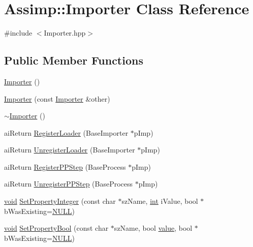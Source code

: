 \hypertarget{class_assimp_1_1_importer}{\section{Assimp\-:\-:Importer Class Reference}
\label{class_assimp_1_1_importer}
}


{\ttfamily \#include $<$Importer.\-hpp$>$}

\subsection*{Public Member Functions}
\begin{DoxyCompactItemize}
\item 
\hyperlink{class_assimp_1_1_importer_a2c207299ed05f1db1ad1e6dab005f719}{Importer} ()
\item 
\hyperlink{class_assimp_1_1_importer_a69743664b5a7a8c195be48265144317b}{Importer} (const \hyperlink{class_assimp_1_1_importer}{Importer} \&other)
\item 
\hyperlink{class_assimp_1_1_importer_a3d65af5286ba22f46220a72a6eb2a1c9}{$\sim$\-Importer} ()
\item 
ai\-Return \hyperlink{class_assimp_1_1_importer_a3846294ffe76d91a1d3096d22d7c6b7d}{Register\-Loader} (Base\-Importer $\ast$p\-Imp)
\item 
ai\-Return \hyperlink{class_assimp_1_1_importer_a3b1f5af2c763b13aca0f324b19001722}{Unregister\-Loader} (Base\-Importer $\ast$p\-Imp)
\item 
ai\-Return \hyperlink{class_assimp_1_1_importer_a102650d3648c0e414a1e73bdad9bed35}{Register\-P\-P\-Step} (Base\-Process $\ast$p\-Imp)
\item 
ai\-Return \hyperlink{class_assimp_1_1_importer_a3a683671c7c40638b1103c5d3648d86c}{Unregister\-P\-P\-Step} (Base\-Process $\ast$p\-Imp)
\item 
\hyperlink{_s_d_l__opengl_8h_a3db05964a3cc4410f35b7ea2b7eb850d}{void} \hyperlink{class_assimp_1_1_importer_aa50eba6120a9b9805d0c2b02f1187165}{Set\-Property\-Integer} (const char $\ast$sz\-Name, \hyperlink{_s_d_l__thread_8h_a6a64f9be4433e4de6e2f2f548cf3c08e}{int} i\-Value, bool $\ast$b\-Was\-Existing=\hyperlink{begin__code_8h_a070d2ce7b6bb7e5c05602aa8c308d0c4}{N\-U\-L\-L})
\item 
\hyperlink{_s_d_l__opengl_8h_a3db05964a3cc4410f35b7ea2b7eb850d}{void} \hyperlink{class_assimp_1_1_importer_acf161a9fdd0d2ed3902e325351311389}{Set\-Property\-Bool} (const char $\ast$sz\-Name, bool \hyperlink{_g_l_e_w_2glew_8h_a79169be77d7e02a24f68a5bfe627dc29}{value}, bool $\ast$b\-Was\-Existing=\hyperlink{begin__code_8h_a070d2ce7b6bb7e5c05602aa8c308d0c4}{N\-U\-L\-L})

\end{DoxyCompactItemize}
